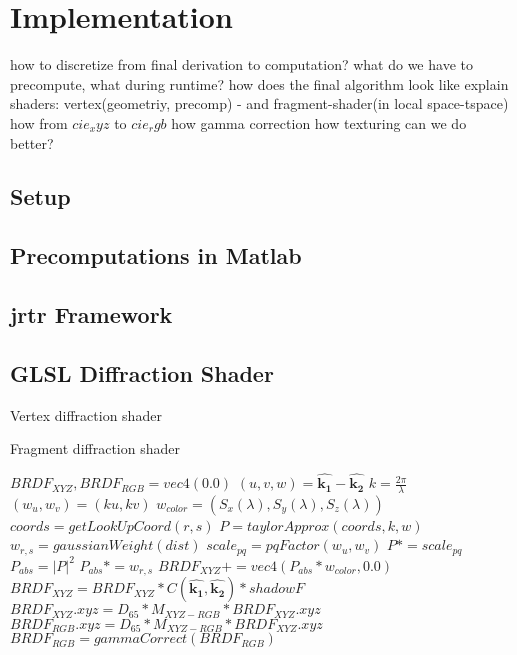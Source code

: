 \section{Implementation}

how to discretize from final derivation to computation?
what do we have to precompute, what during runtime?
how does the final algorithm look like
explain shaders: vertex(geometriy, precomp) - and fragment-shader(in local space-tspace)
how from $cie_xyz$ to $cie_rgb$
how gamma correction
how texturing 
can we do better?

\subsection{Setup}
\subsection{Precomputations in Matlab}
\subsection{jrtr Framework}
\subsection{GLSL Diffraction Shader}


\begin{algorithm}
  \caption{Vertex diffraction shader}
  \begin{algorithmic}
    \EndFor
  \end{algorithmic}
\end{algorithm}

\begin{algorithm}
  \caption{Fragment diffraction shader}
  \begin{algorithmic}
      \State $BRDF_{XYZ}, BRDF_{RGB} = vec4(0.0)$
      \State $(u,v,w) = \hat{\mathbf{k_1}}-\hat{\mathbf{k_2}}$
        \State $k = \frac{2\pi}{\lambda}$
        \State $(w_u, w_v) = (ku, kv)$
        \State $w_{color} = (S_x(\lambda), S_y(\lambda), S_z(\lambda))$
            \State $coords = getLookUpCoord(r, s)$
            \State $P = taylorApprox(coords, k, w)$
            \State $w_{r,s} = gaussianWeight(dist)$
            \State $scale_{pq} = pqFactor(w_u, w_v)$
            \State $P *= scale_{pq}$
            \State $P_{abs} = \left|P\right|^2$
            \State $P_{abs} *= w_{r,s}$
            \State $BRDF_{XYZ} += vec4(P_{abs}*w_{color}, 0.0)$
          \EndFor
        \EndFor
      \EndFor
      \State $BRDF_{XYZ} = BRDF_{XYZ}*C(\hat{\mathbf{k_1}},\hat{\mathbf{k_2}})*shadowF$
      \State $BRDF_{XYZ}.xyz = D_{65}*M_{XYZ-RGB}*BRDF_{XYZ}.xyz$
      \State $BRDF_{RGB}.xyz = D_{65}*M_{XYZ-RGB}*BRDF_{XYZ}.xyz$
      \State $BRDF_{RGB}= gammaCorrect(BRDF_{RGB})$
    \EndFor
  \end{algorithmic}
\end{algorithm}